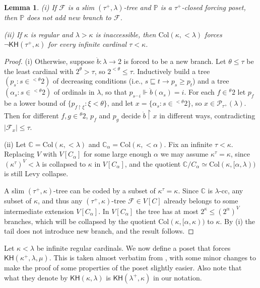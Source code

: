 \documentclass[10pt,reqno]{amsart}
\theoremstyle{plain}
\newtheorem{lemma}[theorem]{Lemma}
\theoremstyle{definition}
\theoremstyle{remark}
\begin{document}
\begin{lemma}\label{KH_Silver}
(i) If $\mathcal{F}$ is a slim $(\tau^+,\lambda)$-tree and $\mathbb{P}$ is a $\tau^+$-closed forcing poset, then $\mathbb{P}$ does not add new branch to $\mathcal{F}$.

(ii) If $\kappa$ is regular and $\lambda>\kappa$ is inaccessible, then $\mathrm{Col}(\kappa,<\lambda)$ forces $\lnot\mathsf{KH}(\tau^+,\kappa)$ for every infinite cardinal $\tau<\kappa$.
\end{lemma}
\begin{proof}
(i) Otherwise, suppose $\dot{b}:\lambda\rightarrow2$ is forced to be a new branch. Let $\theta\leq\tau$ be the least cardinal with $2^\theta>\tau$, so $2^{<\theta}\leq\tau$. Inductively build a tree $(p_s:s\in {}^{<\theta}2)$ of decreasing conditions (i.e., $s\sqsubseteq t\rightarrow p_s\geq p_t$) and a tree $(\alpha_s:s\in {}^{<\theta}2)$ of ordinals in $\lambda$, so that $p_{s^\smallfrown i}\Vdash\dot{b}(\alpha_s)=i$. For each $f\in {}^\theta2$ let $p_f$ be a lower bound of $\{p_{f\upharpoonright\xi}:\xi<\theta\}$, and let $x=\{\alpha_s:s\in {}^{<\theta}2\}$, so $x\in\mathcal{P}_{\tau^+}(\lambda)$. Then for different $f,g\in {}^\theta2$, $p_f$ and $p_g$ decide $\dot{b}\upharpoonright x$ in different ways, contradicting $|\mathcal{F}_x|\leq\tau$.


(ii) Let $\mathbb{C}=\mathrm{Col}(\kappa,<\lambda)$ and $\mathbb{C}_\alpha=\mathrm{Col}(\kappa,<\alpha)$. Fix an infinite $\tau<\kappa$. Replacing $V$ with $V[C_\alpha]$ for some large enough $\alpha$ we may assume $\kappa^\tau=\kappa$, since $(\kappa^\tau)^V<\lambda$ is collapsed to $\kappa$ in $V[C_\alpha]$, and the quotient $\mathbb{C}/C_\alpha\simeq\mathrm{Col}(\kappa,[\alpha,\lambda))$ is still Levy collapse.

A slim $(\tau^+,\kappa)$-tree can be coded by a subset of $\kappa^\tau=\kappa$. Since $\mathbb{C}$ is $\lambda$-cc, any subset of $\kappa$, and thus any $(\tau^+,\kappa)$-tree $\mathcal{F}\in V[C]$ already belongs to some intermediate extension $V[C_\alpha]$. In $V[C_\alpha]$ the tree has at most $2^\kappa\leq(2^{\alpha})^V$ branches, which will be collapsed by the quotient $\mathrm{Col}(\kappa,[\alpha,\kappa))$ to $\kappa$. By (i) the tail does not introduce new branch, and the result follows.
\end{proof}










Let $\kappa<\lambda$ be infinite regular cardinals. We now define a poset that forces $\mathsf{KH}(\kappa^+,\lambda,\mu)$. This is taken almost verbatim from \cite[Lemma 2.1]{friedman-golshani2012independence}, with some minor changes to make the proof of some properties of the poset slightly easier. Also note that what they denote by $\mathsf{KH}(\kappa,\lambda)$ is $\mathsf{KH}(\lambda^+,\kappa)$ in our notation.
\end{document}
